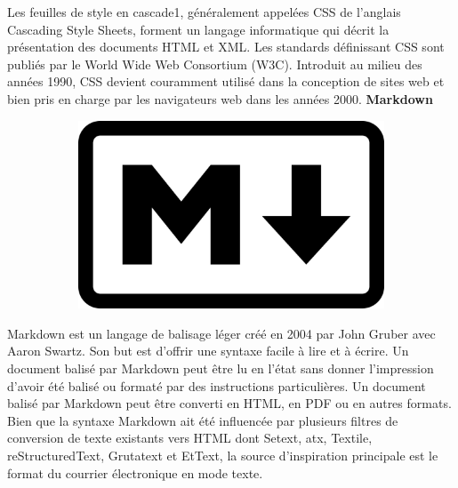 \documentclass{article}
\begin{document}
Les feuilles de style en cascade1, généralement appelées CSS de l'anglais Cascading Style Sheets, forment un langage informatique qui décrit la présentation des documents HTML et XML. Les standards définissant CSS sont publiés par le World Wide Web Consortium (W3C). Introduit au milieu des années 1990, CSS devient couramment utilisé dans la conception de sites web et bien pris en charge par les navigateurs web dans les années 2000.
\newline
\textbf{Markdown}
\newline
\begin{figure}[h!]
	\centering
  	\begin{subfigure}[b]{0.25\linewidth}
	\includegraphics[width=\linewidth]{mark.png}
  	\end{subfigure}
\end{figure}

Markdown est un langage de balisage léger créé en 2004 par John Gruber avec Aaron Swartz. Son but est d'offrir une syntaxe facile à lire et à écrire. Un document balisé par Markdown peut être lu en l'état sans donner l’impression d'avoir été balisé ou formaté par des instructions particulières.
\newline
Un document balisé par Markdown peut être converti en HTML, en PDF ou en autres formats. Bien que la syntaxe Markdown ait été influencée par plusieurs filtres de conversion de texte existants vers HTML dont Setext, atx, Textile, reStructuredText, Grutatext et EtText, la source d’inspiration principale est le format du courrier électronique en mode texte. 
\newline
\end{document}
